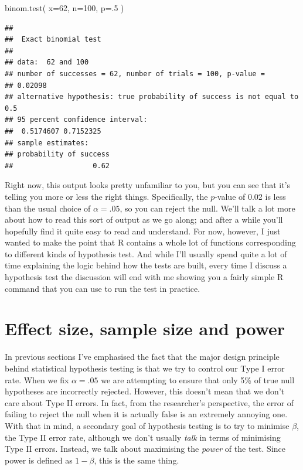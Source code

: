 \documentclass[
]{book}
\newenvironment{Shaded}{\begin{snugshade}}{\end{snugshade}}
\newcommand{\AttributeTok}[1]{\textcolor[rgb]{0.77,0.63,0.00}{#1}}
\newcommand{\DecValTok}[1]{\textcolor[rgb]{0.00,0.00,0.81}{#1}}
\newcommand{\FunctionTok}[1]{\textcolor[rgb]{0.00,0.00,0.00}{#1}}
\newcommand{\NormalTok}[1]{#1}
\begin{document}
\begin{Shaded}
\begin{Highlighting}[]
\FunctionTok{binom.test}\NormalTok{( }\AttributeTok{x=}\DecValTok{62}\NormalTok{, }\AttributeTok{n=}\DecValTok{100}\NormalTok{, }\AttributeTok{p=}\NormalTok{.}\DecValTok{5}\NormalTok{ )}
\end{Highlighting}
\end{Shaded}

\begin{verbatim}
## 
##  Exact binomial test
## 
## data:  62 and 100
## number of successes = 62, number of trials = 100, p-value =
## 0.02098
## alternative hypothesis: true probability of success is not equal to 0.5
## 95 percent confidence interval:
##  0.5174607 0.7152325
## sample estimates:
## probability of success 
##                   0.62
\end{verbatim}

Right now, this output looks pretty unfamiliar to you, but you can see that it's telling you more or less the right things. Specifically, the \(p\)-value of 0.02 is less than the usual choice of \(\alpha = .05\), so you can reject the null. We'll talk a lot more about how to read this sort of output as we go along; and after a while you'll hopefully find it quite easy to read and understand. For now, however, I just wanted to make the point that R contains a whole lot of functions corresponding to different kinds of hypothesis test. And while I'll usually spend quite a lot of time explaining the logic behind how the tests are built, every time I discuss a hypothesis test the discussion will end with me showing you a fairly simple R command that you can use to run the test in practice.

\hypertarget{effectsize}{%
\section{Effect size, sample size and power}\label{effectsize}}

In previous sections I've emphasised the fact that the major design principle behind statistical hypothesis testing is that we try to control our Type I error rate. When we fix \(\alpha = .05\) we are attempting to ensure that only 5\% of true null hypotheses are incorrectly rejected. However, this doesn't mean that we don't care about Type II errors. In fact, from the researcher's perspective, the error of failing to reject the null when it is actually false is an extremely annoying one. With that in mind, a secondary goal of hypothesis testing is to try to minimise \(\beta\), the Type II error rate, although we don't usually \emph{talk} in terms of minimising Type II errors. Instead, we talk about maximising the \emph{power} of the test. Since power is defined as \(1-\beta\), this is the same thing.
\end{document}

